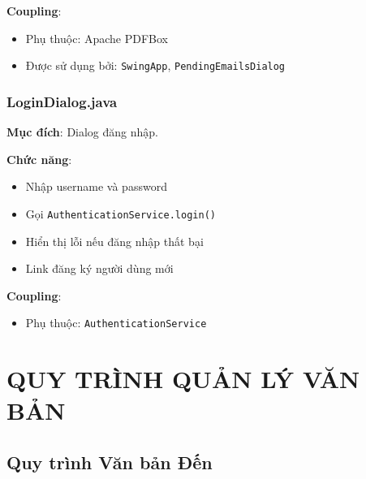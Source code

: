 \documentclass[12pt,a4paper]{article}
\begin{document}
\textbf{Coupling}:
\begin{itemize}
    \item Phụ thuộc: Apache PDFBox
    \item Được sử dụng bởi: \texttt{SwingApp}, \texttt{PendingEmailsDialog}
\end{itemize}

\subsubsection{LoginDialog.java}
\textbf{Mục đích}: Dialog đăng nhập.

\textbf{Chức năng}:
\begin{itemize}
    \item Nhập username và password
    \item Gọi \texttt{AuthenticationService.login()}
    \item Hiển thị lỗi nếu đăng nhập thất bại
    \item Link đăng ký người dùng mới
\end{itemize}

\textbf{Coupling}:
\begin{itemize}
    \item Phụ thuộc: \texttt{AuthenticationService}
\end{itemize}

\section{QUY TRÌNH QUẢN LÝ VĂN BẢN}

\subsection{Quy trình Văn bản Đến}
\end{document}

